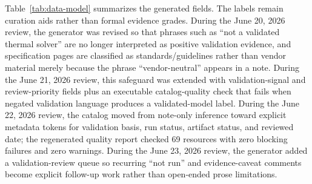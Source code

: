 \documentclass[11pt]{article}
\begin{document}
Table~\ref{tab:data-model} summarizes the generated fields. The labels remain curation aids rather than formal evidence grades. During the June 20, 2026 review, the generator was revised so that phrases such as ``not a validated thermal solver'' are no longer interpreted as positive validation evidence, and specification pages are classified as standards/guidelines rather than vendor material merely because the phrase ``vendor-neutral'' appears in a note. During the June 21, 2026 review, this safeguard was extended with validation-signal and review-priority fields plus an executable catalog-quality check that fails when negated validation language produces a validated-model label. During the June 22, 2026 review, the catalog moved from note-only inference toward explicit metadata tokens for validation basis, run status, artifact status, and reviewed date; the regenerated quality report checked 69 resources with zero blocking failures and zero warnings. During the June 23, 2026 review, the generator added a validation-review queue so recurring ``not run'' and evidence-caveat comments become explicit follow-up work rather than open-ended prose limitations.
\end{document}
